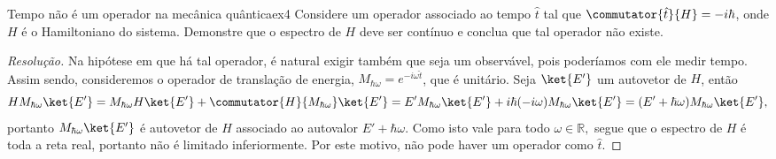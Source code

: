 \begin{exercício}{Tempo não é um operador na mecânica quântica}{ex4}
    Considere um operador associado ao tempo \(\hat{t}\) tal que \( \commutator{\hat{t}}{H} = - i \hbar\), onde \(H\) é o Hamiltoniano do sistema. Demonstre que o espectro de \(H\) deve ser contínuo e conclua que tal operador não existe.
\end{exercício}
\begin{proof}[Resolução]
    Na hipótese em que há tal operador, é natural exigir também que seja um observável, pois poderíamos com ele medir tempo. Assim sendo, consideremos o operador de translação de energia, \(M_{\hbar \omega} = e^{-i \omega \hat{t}}\), que é unitário. Seja \(\ket{E'}\) um autovetor de \(H\), então
    \begin{equation*}
        HM_{\hbar \omega}\ket{E'} =  M_{\hbar \omega} H\ket{E'} + \commutator{H}{M_{\hbar \omega}} \ket{E'} = E' M_{\hbar \omega} \ket{E'} + i \hbar (-i \omega) M_{\hbar \omega} \ket{E'} = (E' + \hbar \omega) M_{\hbar \omega} \ket{E'},
    \end{equation*}
    portanto \(M_{\hbar \omega} \ket{E'}\) é autovetor de \(H\) associado ao autovalor \(E' + \hbar \omega.\) Como isto vale para todo \(\omega \in \mathbb{R},\) segue que o espectro de \(H\) é toda a reta real, portanto não é limitado inferiormente. Por este motivo, não pode haver um operador como \(\hat{t}.\)
\end{proof}
